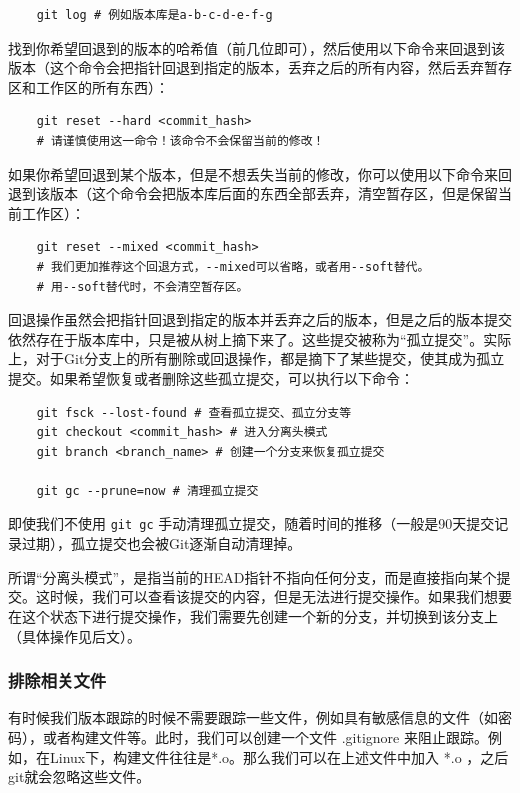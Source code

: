 \documentclass[fontset=none]{ctexart}
\begin{document}
\begin{verbatim}
    git log # 例如版本库是a-b-c-d-e-f-g
\end{verbatim}

找到你希望回退到的版本的哈希值（前几位即可），然后使用以下命令来回退到该版本（这个命令会把指针回退到指定的版本，丢弃之后的所有内容，然后丢弃暂存区和工作区的所有东西）：

\begin{verbatim}
    git reset --hard <commit_hash>
    # 请谨慎使用这一命令！该命令不会保留当前的修改！
\end{verbatim}

如果你希望回退到某个版本，但是不想丢失当前的修改，你可以使用以下命令来回退到该版本（这个命令会把版本库后面的东西全部丢弃，清空暂存区，但是保留当前工作区）：
\begin{verbatim}
    git reset --mixed <commit_hash>
    # 我们更加推荐这个回退方式，--mixed可以省略，或者用--soft替代。
    # 用--soft替代时，不会清空暂存区。
\end{verbatim}

回退操作虽然会把指针回退到指定的版本并丢弃之后的版本，但是之后的版本提交依然存在于版本库中，只是被从树上摘下来了。这些提交被称为“孤立提交”。实际上，对于Git分支上的所有删除或回退操作，都是摘下了某些提交，使其成为孤立提交。如果希望恢复或者删除这些孤立提交，可以执行以下命令：
\begin{verbatim}
    git fsck --lost-found # 查看孤立提交、孤立分支等
    git checkout <commit_hash> # 进入分离头模式
    git branch <branch_name> # 创建一个分支来恢复孤立提交

    git gc --prune=now # 清理孤立提交
\end{verbatim}
即使我们不使用 \texttt{git gc} 手动清理孤立提交，随着时间的推移（一般是90天提交记录过期），孤立提交也会被Git逐渐自动清理掉。

所谓“分离头模式”，是指当前的HEAD指针不指向任何分支，而是直接指向某个提交。这时候，我们可以查看该提交的内容，但是无法进行提交操作。如果我们想要在这个状态下进行提交操作，我们需要先创建一个新的分支，并切换到该分支上（具体操作见后文）。

\subsubsection{排除相关文件}

有时候我们版本跟踪的时候不需要跟踪一些文件，例如具有敏感信息的文件（如密码），或者构建文件等。此时，我们可以创建一个文件 .gitignore 来阻止跟踪。例如，在Linux下，构建文件往往是*.o。那么我们可以在上述文件中加入 *.o ，之后git就会忽略这些文件。
\end{document}
